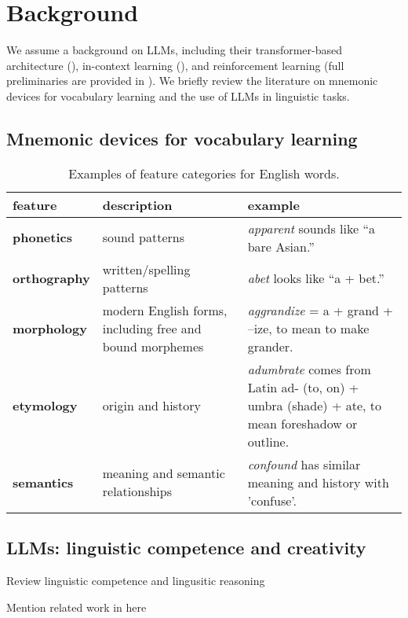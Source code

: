 
\section{Background} \label{sec:background}

We assume a background on LLMs, including their transformer-based architecture (), in-context learning (), and reinforcement learning (full preliminaries are provided in ). We briefly review the literature on mnemonic devices for vocabulary learning and the use of LLMs in linguistic tasks.

\subsection{Mnemonic devices for vocabulary learning} \label{sec:mnemonic-review}



\begin{table*}[htb]
\centering
\caption{Examples of feature categories for English words.}
\label{tab:linguistic-features}
\begin{tabularx}{\textwidth}{l >{\raggedright\arraybackslash}X >{\raggedright\arraybackslash}X}
\toprule
\textbf{feature} & \textbf{description} & \textbf{example} \\
\midrule
\textbf{phonetics} & sound patterns & \emph{apparent} sounds like “a bare Asian.” \\
\addlinespace
\textbf{orthography} & written/spelling patterns & \emph{abet} looks like “a + bet.” \\
\addlinespace
\textbf{morphology} & modern English forms, including free and bound morphemes & \emph{aggrandize} = a + grand + –ize, to mean to make grander. \\
\addlinespace
\textbf{etymology} & origin and history & \emph{adumbrate} comes from Latin ad- (to, on) + umbra (shade) + ate, to mean foreshadow or outline. \\
\addlinespace
\textbf{semantics} & meaning and semantic relationships & \emph{confound} has similar meaning and history with 'confuse'. \\
\bottomrule
\end{tabularx}
\end{table*}
\subsection{LLMs: linguistic competence and creativity} \label{sec:llm-linguistic-competence}

Review linguistic competence and lingusitic reasoning

Mention related work in \citep{KhoujaLINGOLYTOO2025} here
